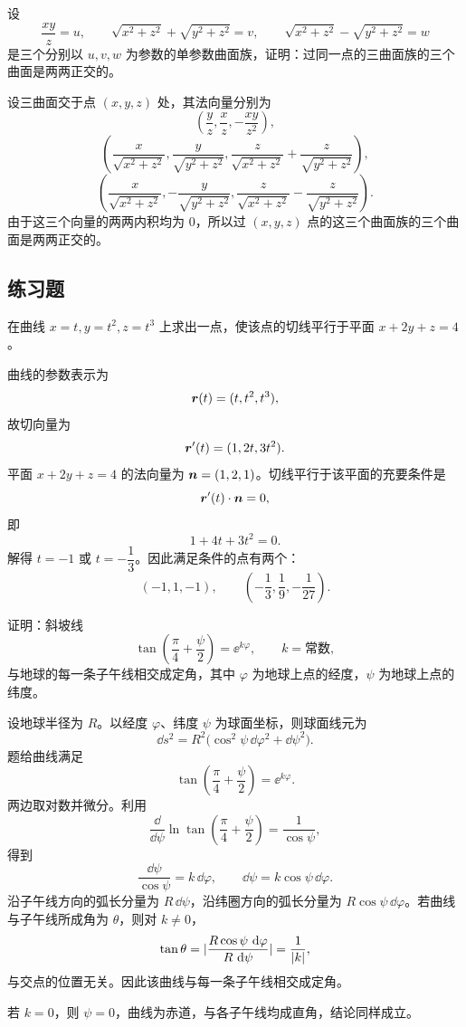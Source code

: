\begin{xexample}[21.1.3]
设
\[
  \frac{xy}{z}=u,\qquad
  \sqrt{x^2+z^2}+\sqrt{y^2+z^2}=v,
  \qquad
  \sqrt{x^2+z^2}-\sqrt{y^2+z^2}=w
\]
是三个分别以 $u,v,w$ 为参数的单参数曲面族，证明：过同一点的三曲面族的三个曲面是两两正交的。
\end{xexample}
\begin{xproof}
设三曲面交于点 $(x,y,z)$ 处，其法向量分别为
\[
  \left(\frac{y}{z},\frac{x}{z},-\frac{xy}{z^2}\right),
\]
\[
  \left(\frac{x}{\sqrt{x^2+z^2}},
  \frac{y}{\sqrt{y^2+z^2}},
  \frac{z}{\sqrt{x^2+z^2}}+\frac{z}{\sqrt{y^2+z^2}}\right),
\]
\[
  \left(\frac{x}{\sqrt{x^2+z^2}},
  -\frac{y}{\sqrt{y^2+z^2}},
  \frac{z}{\sqrt{x^2+z^2}}-\frac{z}{\sqrt{y^2+z^2}}\right).
\]
由于这三个向量的两两内积均为 $0$，所以过 $(x,y,z)$ 点的这三个曲面族的三个曲面是两两正交的。
\end{xproof}

\subsection{练习题}
\begin{xexercise}[1]
在曲线 $x=t,y=t^2,z=t^3$ 上求出一点，使该点的切线平行于平面 $x+2y+z=4$。
\end{xexercise}
\begin{xsolution}
曲线的参数表示为
\[
  \bm{r}(t)=(t,t^2,t^3),
\]
故切向量为
\[
  \bm{r}'(t)=(1,2t,3t^2).
\]
平面 $x+2y+z=4$ 的法向量为 $\bm{n}=(1,2,1)$。切线平行于该平面的充要条件是
\[
  \bm{r}'(t)\cdot\bm{n}=0,
\]
即
\[
  1+4t+3t^2=0.
\]
解得 $t=-1$ 或 $t=-\dfrac13$。因此满足条件的点有两个：
\[
  (-1,1,-1),
  \qquad
  \left(-\frac13,\frac19,-\frac1{27}\right).
\]
\end{xsolution}


\begin{xexercise}[2]
证明：斜坡线
  \[
    \tan\left(\frac{\pi}{4}+\frac{\psi}{2}\right)=\ee^{k\varphi},\qquad k=\text{常数},
  \]
  与地球的每一条子午线相交成定角，其中 $\varphi$ 为地球上点的经度，$\psi$ 为地球上点的纬度。
\end{xexercise}
\begin{xsolution}
设地球半径为 $R$。以经度 $\varphi$、纬度 $\psi$ 为球面坐标，则球面线元为
\[
  \dd s^2=R^2\bigl(\cos^2\psi\,\dd\varphi^2+\dd\psi^2\bigr).
\]
题给曲线满足
\[
  \tan\left(\frac\pi4+\frac\psi2\right)=\ee^{k\varphi}.
\]
两边取对数并微分。利用
\[
  \frac{\dd}{\dd\psi}
  \ln\tan\left(\frac\pi4+\frac\psi2\right)
  =\frac1{\cos\psi},
\]
得到
\[
  \frac{\dd\psi}{\cos\psi}=k\,\dd\varphi,
  \qquad
  \dd\psi=k\cos\psi\,\dd\varphi.
\]
沿子午线方向的弧长分量为 $R\,\dd\psi$，沿纬圈方向的弧长分量为 $R\cos\psi\,\dd\varphi$。若曲线与子午线所成角为 $\theta$，则对 $k\ne0$，
\[
  \tan\theta
  =\lvert\frac{R\cos\psi\,\mathop{}\!\mathrm{d}\varphi}{R\,\mathop{}\!\mathrm{d}\psi}\rvert
  =\frac1{\lvert k\rvert},
\]
与交点的位置无关。因此该曲线与每一条子午线相交成定角。

若 $k=0$，则 $\psi=0$，曲线为赤道，与各子午线均成直角，结论同样成立。
\end{xsolution}



